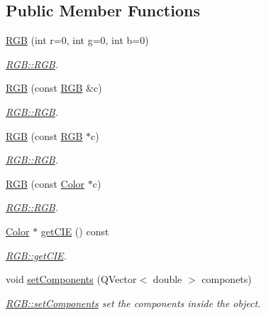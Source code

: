 \subsection*{Public Member Functions}
\begin{DoxyCompactItemize}
\item 
\hyperlink{class_r_g_b_ab48fc0751f6432ff993b31119f289001}{R\+GB} (int r=0, int g=0, int b=0)
\begin{DoxyCompactList}\small\item\em \hyperlink{class_r_g_b_ab48fc0751f6432ff993b31119f289001}{R\+G\+B\+::\+R\+GB}. \end{DoxyCompactList}\item 
\hyperlink{class_r_g_b_a4b69fccf264945ab5d708738824bd93a}{R\+GB} (const \hyperlink{class_r_g_b}{R\+GB} \&c)
\begin{DoxyCompactList}\small\item\em \hyperlink{class_r_g_b_ab48fc0751f6432ff993b31119f289001}{R\+G\+B\+::\+R\+GB}. \end{DoxyCompactList}\item 
\hyperlink{class_r_g_b_a9caf6caec9c6e67896b24ba3a1715342}{R\+GB} (const \hyperlink{class_r_g_b}{R\+GB} $\ast$c)
\begin{DoxyCompactList}\small\item\em \hyperlink{class_r_g_b_ab48fc0751f6432ff993b31119f289001}{R\+G\+B\+::\+R\+GB}. \end{DoxyCompactList}\item 
\hyperlink{class_r_g_b_acabd7e004d54445c5e87f27fcd06ad33}{R\+GB} (const \hyperlink{class_color}{Color} $\ast$c)
\begin{DoxyCompactList}\small\item\em \hyperlink{class_r_g_b_ab48fc0751f6432ff993b31119f289001}{R\+G\+B\+::\+R\+GB}. \end{DoxyCompactList}\item 
\hyperlink{class_color}{Color} $\ast$ \hyperlink{class_r_g_b_ac4b085d5587c664f7f9ceae1eb857d24}{get\+C\+IE} () const
\begin{DoxyCompactList}\small\item\em \hyperlink{class_r_g_b_ac4b085d5587c664f7f9ceae1eb857d24}{R\+G\+B\+::get\+C\+IE}. \end{DoxyCompactList}\item 
void \hyperlink{class_r_g_b_acf213178f2029a5f304d62b87dbb6b36}{set\+Components} (Q\+Vector$<$ double $>$ componets)
\begin{DoxyCompactList}\small\item\em \hyperlink{class_r_g_b_acf213178f2029a5f304d62b87dbb6b36}{R\+G\+B\+::set\+Components} set the components inside the object. \end{DoxyCompactList}\item 

\end{DoxyCompactItemize}
